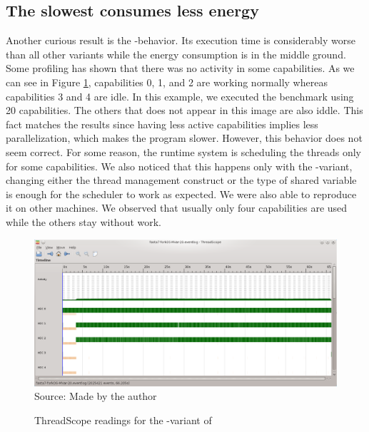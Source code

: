 \subsection{The slowest consumes less energy}
Another curious result is the \forkOS-\MVar behavior. Its execution time is considerably worse than all other variants while the energy consumption is in the middle ground. Some profiling has shown that there was no activity in some capabilities. As we can see in Figure \ref{fig:threadscope2}, capabilities 0, 1, and 2 are working normally whereas capabilities 3 and 4 are idle. In this example, we executed the benchmark using 20 capabilities. The others that does not appear in this image are also iddle. This fact matches the results since having less active capabilities implies less parallelization, which makes the program slower. However, this behavior does not seem correct. For some reason, the runtime system is scheduling the threads only for some capabilities. We also noticed that this happens only with the \forkOS-\MVar variant, changing either the thread management construct or the type of shared variable is enough for the scheduler to work as expected. We were also able to reproduce it on other machines. We observed that usually only four capabilities are used while the others stay without work.

\begin{figure}
\caption{ThreadScope readings for the \forkOS-\MVar variant of \fasta}
\centering
\includegraphics[width=\linewidth]{images/fasta-forkOS-MVar-20}
\footnotesize{Source: Made by the author}
\label{fig:threadscope2}
\end{figure}

